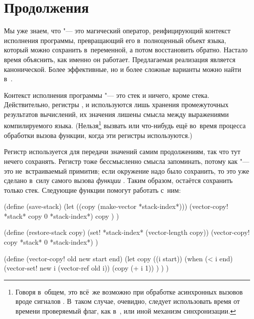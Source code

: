 \section{Продолжения}\label{compilation/sect:continue}

Мы уже знаем, что  "--- это магический оператор, реифицирующий
контекст исполнения программы, превращающий его в~полноценный объект языка,
который можно сохранить в~переменной, а потом восстановить обратно. Настало
время объяснить, как именно он работает. Предлагаемая реализация является
канонической. Более эффективные, но и более сложные варианты можно найти
в~\cite{cho88,hdb90,mb93}.

Контекст исполнения программы "--- это стек и ничего, кроме стека.
Действительно, регистры ,  и  используются лишь
хранения промежуточных результатов вычислений, их значения лишены смысла между
выражениями компилируемого языка. (Нельзя\footnote{Говоря в~общем, это всё~же
возможно при обработке асинхронных вызовов вроде сигналов \UNIX. В~таком случае,
очевидно, следует использовать время от времени проверяемый флаг, как
в~\cite{dev85}, или иной механизм синхронизации.} вызвать  или
что-нибудь ещё во~время процесса обработки вызова функции, когда эти регистры
используются.)

Регистр  используется для передачи значений самим продолжениям, так
что тут нечего сохранять. Регистр  тоже бессмысленно смысла
запоминать, потому как  "--- это не~встраиваемый примитив; если
окружение надо было сохранить, то это уже сделано в~силу самого вызова
\emph{функции} . Таким образом, остаётся сохранить только стек.
Следующие функции помогут работать с~ним:

\begin{code:lisp}
(define (save-stack)
  (let ((copy (make-vector *stack-index*)))
    (vector-copy! *stack* copy 0 *stack-index*)
    copy ) )

(define (restore-stack copy)
  (set! *stack-index* (vector-length copy))
  (vector-copy! copy *stack* 0 *stack-index*) )

(define (vector-copy! old new start end)
  (let copy ((i start))
    (when (< i end)
          (vector-set! new i (vector-ref old i))
          (copy (+ i 1)) ) ) )
\end{code:lisp}

